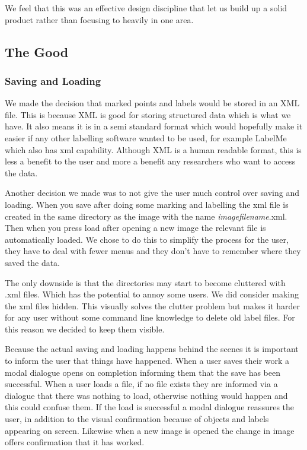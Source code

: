 \documentclass[a4paper,11pt,oneside]{article}
\begin{document}
We feel that this was an effective design discipline that let us build up a
solid product rather than focusing to heavily in one area.

\subsection{The Good}

\subsubsection{Saving and Loading}
We made the decision that marked points and labels would be stored in an XML
file.  This is because XML is good for storing structured data which is what we
have.  It also means it is in a semi standard format which would hopefully make
it easier if any other labelling software wanted to be used, for example LabelMe
which also has xml capability.  Although XML is a human readable format, this is
less a benefit to the user and more a benefit any researchers who want to access
the data.

Another decision we made was to not give the user much control over saving and
loading.  When you save after doing some marking and labelling the xml file is
created in the same directory as the image with the name
\emph{imagefilename}.xml.  Then when you press load after opening a new image
the relevant file is automatically loaded.  We chose to do this to simplify the
process for the user, they have to deal with fewer menus and they don't have to
remember where they saved the data.

The only downside is that the directories may start to become cluttered with
.xml files.  Which has the potential to annoy some users.  We did consider
making the xml files hidden.  This visually solves the clutter problem but
makes it harder for any user without some command line knowledge to delete old
label files.  For this reason we decided to keep them visible.

Because the actual saving and loading happens behind the scenes it is important
to inform the user that things have happened.  When a user saves their work a
modal dialogue opens on completion informing them that the save has been
successful. When a user loads a file, if no file exists they are informed via a
dialogue that there was nothing to load, otherwise nothing would happen and this
could confuse them.  If the load is successful a modal dialogue reassures the
user, in addition to the visual confirmation because of objects and
labels appearing on screen. Likewise when a new image is opened the change in
image offers confirmation that it has worked.
\end{document}
